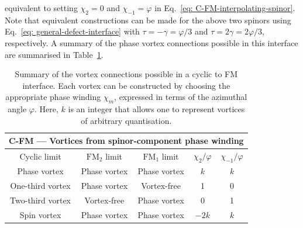 equivalent to setting \(\chi_2 = 0\) and \(\chi_{-1}=\varphi \) in
Eq.~\eqref{eq: C-FM-interpolating-spinor}.
Note that equivalent constructions can be made for the above two spinors using
Eq.~\eqref{eq: general-defect-interface} with \(\tau=-\gamma=\varphi/3\) and
\(\tau=2\gamma=2\varphi/3\), respectively.
A summary of the phase vortex connections possible in this interface are
summarised in Table~\ref{tab: C-FM-vortices}.
\begin{table}
    \centering
    \begin{tabular}{ccccc}
        \toprule
        \multicolumn{5}{c}{C-FM --- Vortices from spinor-component phase
            winding} \\
        \midrule
        Cyclic limit & \(\text{FM}_2\) limit & \(\text{FM}_1\) limit
            & \(\chi_2/\varphi \) & \(\chi_{-1}/\varphi \) \\
        \midrule
         Phase vortex & Phase vortex & Phase vortex & \(k\) & \(k\) \\ 
         One-third vortex & Phase vortex & Vortex-free & 1 & 0 \\
         Two-third vortex & Vortex-free & Phase vortex & 0 & 1 \\
         Spin vortex & Phase vortex & Phase vortex & \(-2k\) & \(k\) \\
        \bottomrule
    \end{tabular}
    \caption[Examples of possible vortex connections across a cyclic to
    ferromagnetic interface]{\label{tab: C-FM-vortices}Summary of the vortex
    connections possible in a cyclic to FM interface.
    Each vortex can be constructed by choosing the appropriate phase winding
    \(\chi_m\), expressed in terms of the azimuthal angle \(\varphi \).
    Here, \(k \) is an integer that allows one to represent vortices of
    arbitrary quantisation.}
\end{table}

